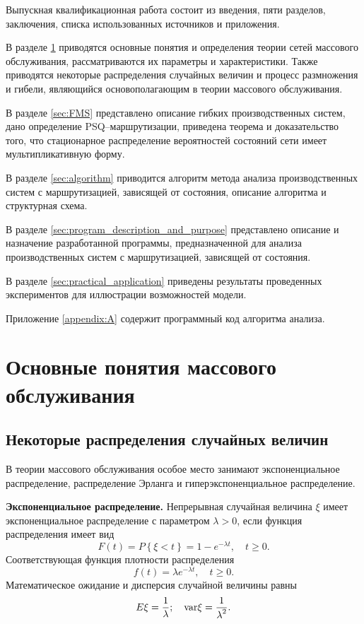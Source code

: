 Выпускная квалификационная работа состоит из введения, пяти разделов, заключения, списка использованных источников и приложения.

В разделе \ref{sec:basic_concepts} приводятся основные понятия и определения теории сетей массового обслуживания, рассматриваются их параметры и характеристики. Также приводятся некоторые распределения случайных величин и процесс размножения и гибели, являющийся основополагающим в теории массового обслуживания.

В разделе \ref{sec:FMS} представлено описание гибких производственных систем, дано определение PSQ--маршрутизации, приведена теорема и доказательство того, что стационарное распределение вероятностей состояний сети имеет мультипликативную форму.

В разделе \ref{sec:algorithm} приводится алгоритм метода анализа производственных систем с маршрутизацией, зависящей от состояния, описание алгоритма и структурная схема.

В разделе \ref{sec:program_description_and_purpose} представлено описание и назначение разработанной программы, предназначенной для анализа производственных систем с маршрутизацией, зависящей от состояния.

В разделе \ref{sec:practical_application} приведены результаты проведенных экспериментов для иллюстрации возможностей модели.

Приложение \ref{appendix:A} содержит программный код алгоритма анализа.




\section{Основные понятия массового обслуживания}
\label{sec:basic_concepts}

\subsection{Некоторые распределения случайных величин}
\label{subsec:random_var_distribution}

В теории массового обслуживания особое место занимают экспоненциальное распределение, распределение Эрланга и гиперэкспоненциальное распределение.

\textbf{Экспоненциальное распределение.} Непрерывная случайная величина $\xi$ имеет экспоненциальное распределение с параметром $\lambda>0$, если функция распределения имеет вид
\begin{equation*}
 F(t) = P\left\{ {\xi  < t} \right\} = 1 - {e^{ - \lambda t}}, \quad t \ge 0.
\end{equation*}
Соответствующая функция плотности распределения
\begin{equation*}
 f(t) = \lambda {e^{ - \lambda t}}, \quad t \ge 0.
\end{equation*}
Математическое ожидание и дисперсия случайной величины равны
\begin{equation*}
 E\xi  = \frac{1}{\lambda }; \quad {\mathop{\rm var}} \xi  = \frac{1}{{\mathop \lambda \nolimits^2 }}.
\end{equation*}

